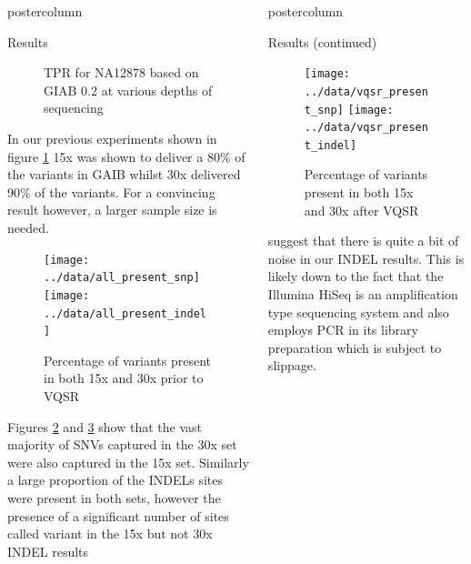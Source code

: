 \documentclass[final,xcolor=table]{beamer}
\begin{document}
\begin{frame}{}
\begin{columns}[t]
\begin{column}{.49\textwidth}
\begin{beamercolorbox}[center,wd=\textwidth]{postercolumn}
\begin{minipage}[T]{.95\textwidth}
\begin{block}{Results}
\begin{figure}
                \caption{TPR for NA12878 based on GIAB 0.2 at various depths of sequencing}
                \label{fig:na12878_ds}
                \end{figure}
{In our previous experiments shown in figure \ref{fig:na12878_ds} 15x was shown to deliver a 80\% of the variants in GAIB whilst 30x delivered 90\% of the variants. For a convincing result however, a larger sample size is needed.}
                \begin{figure}
                \texttt{[image: ../data/all\_present\_snp]}
                \texttt{[image: ../data/all\_present\_indel]}
                \caption{Percentage of variants present in both 15x and 30x prior to VQSR}
                \label{fig:all_present}
                \end{figure}
{Figures \ref{fig:all_present} and \ref{fig:vqsr_present} show that the vast majority of SNVs captured in the 30x set were also captured in the 15x set. Similarly a large proportion of the INDELs sites were present in both sets, however the presence of a significant number of sites called variant in the 15x but not 30x INDEL results}

            \end{block}
            \vfill

            \end{minipage}
        \end{beamercolorbox}
    \end{column}
    \begin{column}{.49\textwidth}
        \begin{beamercolorbox}[center,wd=\textwidth]{postercolumn}
            \begin{minipage}[T]{.95\textwidth}  %

            \begin{block}{Results (continued)}
                \begin{figure}
                \texttt{[image: ../data/vqsr\_present\_snp]}
                \texttt{[image: ../data/vqsr\_present\_indel]}
                \caption{Percentage of variants present in both 15x and 30x after VQSR}
                \label{fig:vqsr_present}
                \end{figure}

                {suggest that there is quite a bit of noise in our INDEL results. This is likely down to the fact that the Illumina HiSeq is an amplification type sequencing system and also employs PCR in its library preparation which is subject to slippage.}


\end{block}
\end{minipage}
\end{beamercolorbox}
\end{column}
\end{columns}
\end{frame}
\end{document}
